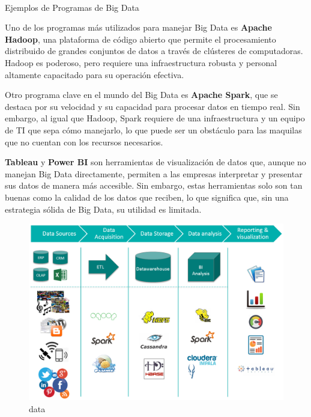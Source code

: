 \documentclass[
  10pt,
  letterpaper,
]{book}
\makeatletter
\let\oldparagraph\paragraph
\renewcommand{\paragraph}{
    \@ifstar
      \xxxParagraphStar
      \xxxParagraphNoStar
  }
\newcommand{\xxxParagraphStar}[1]{\oldparagraph*{#1}\mbox{}}
\newcommand{\xxxParagraphNoStar}[1]{\oldparagraph{#1}\mbox{}}
\makeatother
\begin{document}
\paragraph{Ejemplos de Programas de Big
Data}\label{ejemplos-de-programas-de-big-data}

Uno de los programas más utilizados para manejar Big Data es
\textbf{Apache Hadoop}, una plataforma de código abierto que permite el
procesamiento distribuido de grandes conjuntos de datos a través de
clústeres de computadoras. Hadoop es poderoso, pero requiere una
infraestructura robusta y personal altamente capacitado para su
operación efectiva.

Otro programa clave en el mundo del Big Data es \textbf{Apache Spark},
que se destaca por su velocidad y su capacidad para procesar datos en
tiempo real. Sin embargo, al igual que Hadoop, Spark requiere de una
infraestructura y un equipo de TI que sepa cómo manejarlo, lo que puede
ser un obstáculo para las maquilas que no cuentan con los recursos
necesarios.

\textbf{Tableau} y \textbf{Power BI} son herramientas de visualización
de datos que, aunque no manejan Big Data directamente, permiten a las
empresas interpretar y presentar sus datos de manera más accesible. Sin
embargo, estas herramientas solo son tan buenas como la calidad de los
datos que reciben, lo que significa que, sin una estrategia sólida de
Big Data, su utilidad es limitada.

\begin{figure}[H]

{\centering \includegraphics{Img/data.png}

}

\caption{data}

\end{figure}%
\end{document}

